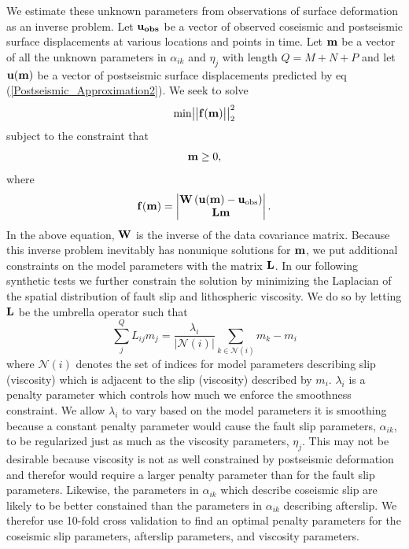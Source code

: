 \documentclass[12pt]{article}
\begin{document}
We estimate these unknown parameters from observations of surface
deformation as an inverse problem. Let $\bold{u_{obs}}$ be a vector of
observed coseismic and postseismic surface displacements at various
locations and points in time.  Let $\bold{m}$ be a vector of all the
unknown parameters in $\alpha_{ik}$ and $\eta_j$ with length $Q=M+N+P$
and let $\bold{u(m)}$ be a vector of postseismic surface displacements
predicted by eq (\ref{Postseismic_Approximation2}). We seek to solve
\begin{equation}\label{Inverse_Problem}
  \mathrm{min}
  \big|\big|\bold{f(m)}\big|\big|_2^2
\end{equation}
subject to the constraint that
\begin{equation}
  \bold{m}\geq0,
\end{equation}
where 
\begin{equation}
  \bold{f(m)} = 
    \begin{vmatrix}
      \bold{W}\left(\bold{u(m)}-\bold{u}_{\mathrm{obs}}\right)\\
      \bold{Lm}\\
    \end{vmatrix} .
\end{equation}  
In the above equation, $\bold{W}$ is the inverse of the data
covariance matrix. Because this inverse problem inevitably has
nonunique solutions for $\bold{m}$, we put additional constraints on
the model parameters with the matrix $\bold{L}$.  In our following
synthetic tests we further constrain the solution by minimizing the
Laplacian of the spatial distribution of fault slip and lithospheric
viscosity.  We do so by letting $\bold{L}$ be the umbrella operator
\citep{D1999} such that
\begin{equation}
  \sum_j^{Q}L_{ij}m_j = \frac{\lambda_i}{|\mathcal{N}(i)|}\sum_{k\in \mathcal{N}(i)} m_k - m_i
\end{equation}
where $\mathcal{N}(i)$ denotes the set of indices for model parameters
describing slip (viscosity) which is adjacent to the slip (viscosity)
described by $m_i$. $\lambda_i$ is a penalty parameter which controls
how much we enforce the smoothness constraint. We allow $\lambda_i$ to
vary based on the model parameters it is smoothing because a constant
penalty parameter would cause the fault slip parameters,
$\alpha_{ik}$, to be regularized just as much as the viscosity
parameters, $\eta_j$.  This may not be desirable because viscosity is
not as well constrained by postseismic deformation and therefor would
require a larger penalty parameter than for the fault slip
parameters. Likewise, the parameters in $\alpha_{ik}$ which describe
coseismic slip are likely to be better constained than the parameters
in $\alpha_{ik}$ describing afterslip.  We therefor use 10-fold cross
validation to find an optimal penalty parameters for the coseismic
slip parameters, afterslip parameters, and viscosity parameters.
\end{document}
